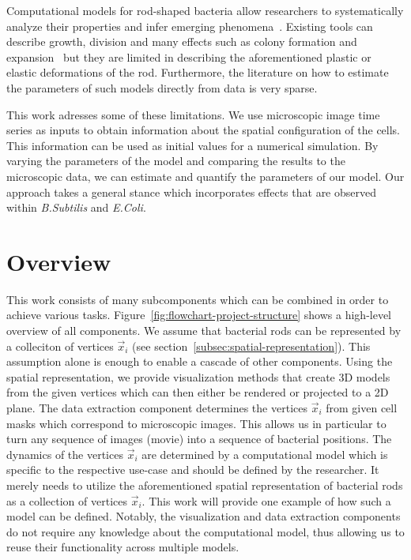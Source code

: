 \documentclass{article}
\begin{document}
Computational models for rod-shaped bacteria allow researchers to systematically analyze their
properties and infer emerging phenomena~\cite{Cho2007,Jnsson2005}.
Existing tools can describe growth, division and many effects such as colony formation and
expansion~\cite{Matyjaszkiewicz2017,Doumic2020} but they are limited in describing the
aforementioned plastic or elastic deformations of the rod.
Furthermore, the literature on how to estimate the parameters of such models directly from data is
very sparse.

This work adresses some of these limitations.
We use microscopic image time series as inputs to obtain information about the spatial
configuration of the cells.
This information can be used as initial values for a numerical simulation.
By varying the parameters of the model and comparing the results to the microscopic data, we can
estimate and quantify the parameters of our model.
Our approach takes a general stance which incorporates effects that are observed within
\textit{B.Subtilis} and \textit{E.Coli}.

% 

\section{Overview}
This work consists of many subcomponents which can be combined in order to achieve various tasks.
Figure~\ref{fig:flowchart-project-structure} shows a high-level overview of all components.
We assume that bacterial rods can be represented by a colleciton of vertices $\vec{x}_i$ (see
section~\ref{subsec:spatial-representation}).
This assumption alone is enough to enable a cascade of other components.
Using the spatial representation, we provide visualization methods that create 3D models from the
given vertices which can then either be rendered or projected to a 2D plane.
The data extraction component determines the vertices $\vec{x}_i$ from given cell masks which
correspond to microscopic images.
This allows us in particular to turn any sequence of images (movie) into a sequence of bacterial
positions.
The dynamics of the vertices $\vec{x}_i$ are determined by a computational model which is specific
to the respective use-case and should be defined by the researcher.
It merely needs to utilize the aforementioned spatial representation of bacterial rods as a
collection of vertices $\vec{x}_i$.
This work will provide one example of how such a model can be defined.
Notably, the visualization and data extraction components do not require any knowledge about the
computational model, thus allowing us to reuse their functionality across multiple models.
\end{document}
